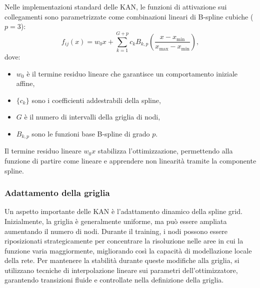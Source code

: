\documentclass[a4paper,12pt]{report}
\begin{document}
	Nelle implementazioni standard delle KAN, le funzioni di attivazione sui collegamenti sono parametrizzate come combinazioni lineari di B-spline cubiche (\(p=3\)):
	\[
	f_{ij}(x) = w_0 x + \sum_{k=1}^{G+p} c_k B_{k,p}\left(\frac{x - x_{\min}}{x_{\max} - x_{\min}}\right),
	\]
	dove:
	\begin{itemize}
		\item \(w_0\) è il termine residuo lineare che garantisce un comportamento iniziale affine,
		\item \(\{c_k\}\) sono i coefficienti addestrabili della spline,
		\item \(G\) è il numero di intervalli della griglia di nodi,
		\item \(B_{k,p}\) sono le funzioni base B-spline di grado \(p\).
	\end{itemize}
	Il termine residuo lineare \(w_0 x\) stabilizza l’ottimizzazione, permettendo alla funzione di partire come lineare e apprendere non linearità tramite la componente spline.
	
	\subsubsection{Adattamento della griglia}
	Un aspetto importante delle KAN è l’adattamento dinamico della spline grid. Inizialmente, la griglia è generalmente uniforme, ma può essere ampliata aumentando il numero di nodi. Durante il training, i nodi possono essere riposizionati strategicamente per concentrare la risoluzione nelle aree in cui la funzione varia maggiormente, migliorando così la capacità di modellazione locale della rete. Per mantenere la stabilità durante queste modifiche alla griglia, si utilizzano tecniche di interpolazione lineare sui parametri dell’ottimizzatore, garantendo transizioni fluide e controllate nella definizione della griglia.
	
\end{document}
